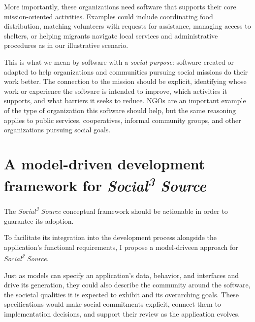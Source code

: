 \documentclass[11pt,a4paper]{article}
\newcommand{\socialsource}{\texorpdfstring{\textit{Social\textsuperscript{3} Source}}{Social3 Source}}
\begin{document}
More importantly, these organizations need software that supports their core mission-oriented activities.
Examples could include coordinating food distribution, matching volunteers with requests for assistance, managing access to shelters, or helping migrants navigate local services and administrative procedures as in our illustrative scenario.


This is what we mean by software with a \emph{social purpose}: software created or adapted to help organizations and communities pursuing social missions do their work better.
The connection to the mission should be explicit, identifying whose work or experience the software is intended to improve, which activities it supports, and what barriers it seeks to reduce.
NGOs are an important example of the type of organization this software should help, but the same reasoning applies to public services, cooperatives, informal community groups, and other organizations pursuing social goals.

\section{A model-driven development framework for \socialsource{}}
\label{sec:besser}

The \socialsource{} conceptual framework should be actionable in order to guarantee its adoption.

To facilitate its integration into the development process alongside the application's functional requirements, I propose a model-driveen approach for \socialsource{}.

Just as models can specify an application's data, behavior, and interfaces and drive its generation, they could also describe the community around the software, the societal qualities it is expected to exhibit and its overarching goals.
These specifications would make social commitments explicit, connect them to implementation decisions, and support their review as the application evolves.
\end{document}

